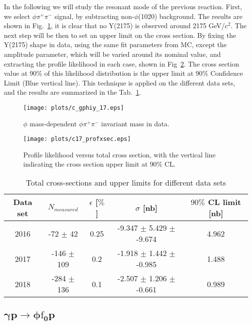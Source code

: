 In the following we will study the resonant mode of the previous reaction. First, we select $\phi \pi^+ \pi^-$ signal, by subtracting non-$\phi$(1020) background. The results are shown in Fig.~\ref{fig.4.5.2.1}, it is clear that no Y(2175) is observed around 2175 GeV/c$^2$. The next step will be then to set an upper limit on the cross section. By fixing the Y(2175) shape in data, using the same fit parameters from MC, except the amplitude parameter, which will be varied around its nominal value, and extracting the profile likelihood in each case, shown in Fig~\ref{fig.4.5.2.2}. The cross section value at 90$\%$ of this likelihood distribution is the upper limit at 90$\%$ Confidence Limit (Blue vertical line). This technique is applied on the different data sets, and the results are summarized in the Tab.~\ref{tab.4.5.2}.

\begin{figure}[H]
    \centering
    \texttt{[image: plots/c\_gphiy\_17.eps]}
    \caption{\label{fig.4.5.2.1}$\phi$ mass-dependent $\phi \pi^+ \pi^-$ invariant mass in data.}
\end{figure}

\begin{figure}[H]
    \centering
    \texttt{[image: plots/c17\_profxsec.eps]}
    \caption{\label{fig.4.5.2.2}Profile likelihood versus total cross section, with the vertical line indicating the cross section upper limit at 90$\%$ CL.}
\end{figure}

\begin{table}[!htbp]
    \centering
    \caption{Total cross-sections and upper limits for different data sets}
    \label{tab.4.5.2}
    \begin{tabular}{|c|c|c|c|c|}
        \hline
        Data set & $N_{measured}$ & $\epsilon$ [$\%$] & $\sigma$ [nb] & $90\%$ CL limit [nb] \\
        \hline
        2016 &  -72 $\pm$ 42 & 0.25 & -9.347 $\pm$ 5.429 $\pm$ -9.674 & 4.962 \\
        \hline
        2017 & -146 $\pm$ 109 & 0.2 & -1.918 $\pm$ 1.442 $\pm$ -0.985 & 1.488 \\
        \hline
        2018 & -284 $\pm$ 136 & 0.1 & -2.507 $\pm$ 1.206 $\pm$ -0.661 & 0.989 \\
        \hline
    \end{tabular}
\end{table}

\subsection{\texorpdfstring{$\bm{\gamma p \rightarrow \phi \mathrm{f}_0 p}$}{}}
\label{p.4.5.3}

